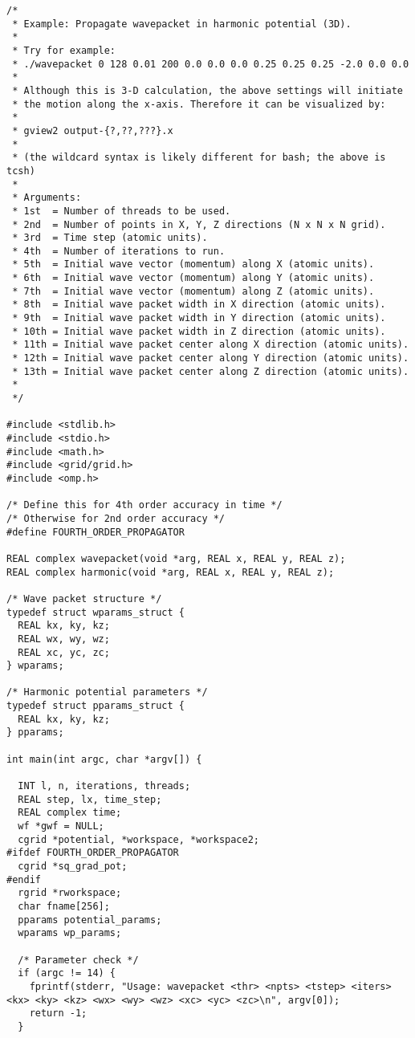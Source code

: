 \documentclass[12pt,letterpaper]{report}
\begin{document}
\begin{verbatim}
/*
 * Example: Propagate wavepacket in harmonic potential (3D).
 *
 * Try for example:
 * ./wavepacket 0 128 0.01 200 0.0 0.0 0.0 0.25 0.25 0.25 -2.0 0.0 0.0
 *
 * Although this is 3-D calculation, the above settings will initiate
 * the motion along the x-axis. Therefore it can be visualized by:
 *
 * gview2 output-{?,??,???}.x
 * 
 * (the wildcard syntax is likely different for bash; the above is tcsh)
 *
 * Arguments:
 * 1st  = Number of threads to be used.
 * 2nd  = Number of points in X, Y, Z directions (N x N x N grid).
 * 3rd  = Time step (atomic units).
 * 4th  = Number of iterations to run.
 * 5th  = Initial wave vector (momentum) along X (atomic units).
 * 6th  = Initial wave vector (momentum) along Y (atomic units).
 * 7th  = Initial wave vector (momentum) along Z (atomic units).
 * 8th  = Initial wave packet width in X direction (atomic units).
 * 9th  = Initial wave packet width in Y direction (atomic units).
 * 10th = Initial wave packet width in Z direction (atomic units).
 * 11th = Initial wave packet center along X direction (atomic units).
 * 12th = Initial wave packet center along Y direction (atomic units).
 * 13th = Initial wave packet center along Z direction (atomic units).
 *
 */

#include <stdlib.h>
#include <stdio.h>
#include <math.h>
#include <grid/grid.h>
#include <omp.h>

/* Define this for 4th order accuracy in time */
/* Otherwise for 2nd order accuracy */
#define FOURTH_ORDER_PROPAGATOR

REAL complex wavepacket(void *arg, REAL x, REAL y, REAL z);
REAL complex harmonic(void *arg, REAL x, REAL y, REAL z);

/* Wave packet structure */
typedef struct wparams_struct {
  REAL kx, ky, kz;
  REAL wx, wy, wz;
  REAL xc, yc, zc;
} wparams;

/* Harmonic potential parameters */
typedef struct pparams_struct {
  REAL kx, ky, kz;
} pparams;

int main(int argc, char *argv[]) {

  INT l, n, iterations, threads;
  REAL step, lx, time_step;
  REAL complex time;
  wf *gwf = NULL;
  cgrid *potential, *workspace, *workspace2;
#ifdef FOURTH_ORDER_PROPAGATOR
  cgrid *sq_grad_pot;
#endif
  rgrid *rworkspace;
  char fname[256];
  pparams potential_params;
  wparams wp_params;
  
  /* Parameter check */
  if (argc != 14) {
    fprintf(stderr, "Usage: wavepacket <thr> <npts> <tstep> <iters> <kx> <ky> <kz> <wx> <wy> <wz> <xc> <yc> <zc>\n", argv[0]);
    return -1;
  }
  

\end{verbatim}
\end{document}
